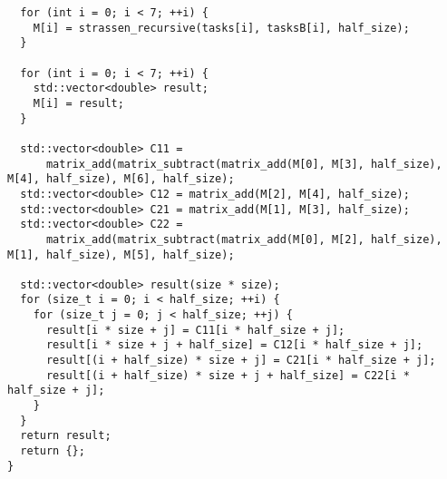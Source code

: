 \documentclass{report}
\begin{document}
\begin{lstlisting}
  for (int i = 0; i < 7; ++i) {
    M[i] = strassen_recursive(tasks[i], tasksB[i], half_size);
  }

  for (int i = 0; i < 7; ++i) {
    std::vector<double> result;
    M[i] = result;
  }

  std::vector<double> C11 =
      matrix_add(matrix_subtract(matrix_add(M[0], M[3], half_size), M[4], half_size), M[6], half_size);
  std::vector<double> C12 = matrix_add(M[2], M[4], half_size);
  std::vector<double> C21 = matrix_add(M[1], M[3], half_size);
  std::vector<double> C22 =
      matrix_add(matrix_subtract(matrix_add(M[0], M[2], half_size), M[1], half_size), M[5], half_size);

  std::vector<double> result(size * size);
  for (size_t i = 0; i < half_size; ++i) {
    for (size_t j = 0; j < half_size; ++j) {
      result[i * size + j] = C11[i * half_size + j];
      result[i * size + j + half_size] = C12[i * half_size + j];
      result[(i + half_size) * size + j] = C21[i * half_size + j];
      result[(i + half_size) * size + j + half_size] = C22[i * half_size + j];
    }
  }
  return result;
  return {};
}
\end{lstlisting}
\end{document}
